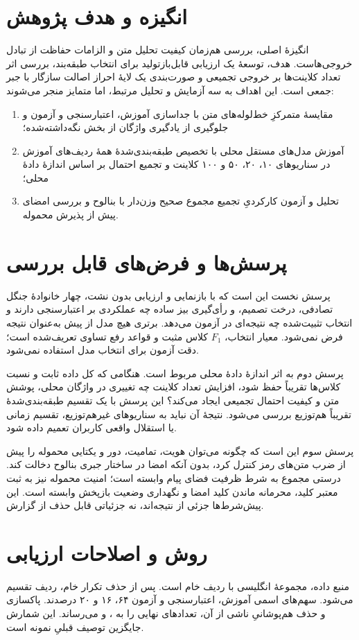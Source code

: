 \section*{انگیزه و هدف پژوهش}
انگیزۀ اصلی، بررسی هم‌زمان کیفیت تحلیل متن و الزامات حفاظت از تبادل خروجی‌هاست. هدف، توسعۀ یک ارزیابی قابل‌بازتولید برای انتخاب طبقه‌بند، بررسی اثر تعداد کلاینت‌ها بر خروجی تجمیعی و صورت‌بندی یک لایۀ احراز اصالت سازگار با جبر جمعی است. این اهداف به سه آزمایش و تحلیل مرتبط، اما متمایز منجر می‌شوند:
\begin{enumerate}
\item مقایسۀ متمرکزِ خط‌لوله‌های متن با جداسازی آموزش، اعتبارسنجی و آزمون و جلوگیری از یادگیری واژگان از بخش نگه‌داشته‌شده؛
\item آموزش مدل‌های مستقل محلی با تخصیص طبقه‌بندی‌شدۀ همۀ ردیف‌های آموزش در سناریوهای ۱۰، ۲۰، ۵۰ و ۱۰۰ کلاینت و تجمیع احتمال بر اساس اندازۀ دادۀ محلی؛
\item تحلیل و آزمون کارکردیِ تجمیع مجموع صحیح وزن‌دار با بنالوح و بررسی امضای  پیش از پذیرش محموله.
\end{enumerate}

\section*{پرسش‌ها و فرض‌های قابل بررسی}
پرسش نخست این است که با بازنمایی  و ارزیابی بدون نشت، چهار خانوادۀ جنگل تصادفی، درخت تصمیم،  و رأی‌گیری بیز ساده چه عملکردی بر اعتبارسنجی دارند و انتخاب تثبیت‌شده چه نتیجه‌ای در آزمون می‌دهد. برتری هیچ مدل از پیش به‌عنوان نتیجه فرض نمی‌شود. معیار انتخاب، $F_1$ کلاس مثبت و قواعد رفع تساوی تعریف‌شده است؛ دقت آزمون برای انتخاب مدل استفاده نمی‌شود.

پرسش دوم به اثر اندازۀ دادۀ محلی مربوط است. هنگامی که کل داده ثابت و نسبت کلاس‌ها تقریباً حفظ شود، افزایش تعداد کلاینت چه تغییری در واژگان محلی، پوشش متن و کیفیت احتمال تجمیعی ایجاد می‌کند؟ این پرسش با یک تقسیم طبقه‌بندی‌شدۀ تقریباً هم‌توزیع بررسی می‌شود. نتیجۀ آن نباید به سناریوهای غیرهم‌توزیع، تقسیم زمانی یا استقلال واقعی کاربران تعمیم داده شود.

پرسش سوم این است که چگونه می‌توان هویت، تمامیت، دور و یکتایی محموله را پیش از ضرب متن‌های رمز کنترل کرد، بدون آنکه امضا در ساختار جبری بنالوح دخالت کند. درستی مجموع به شرط ظرفیت فضای پیام وابسته است؛ امنیت محموله نیز به ثبت معتبر کلید، محرمانه ماندن کلید امضا و نگهداری وضعیت بازپخش وابسته است. این پیش‌شرط‌ها جزئی از نتیجه‌اند، نه جزئیاتی قابل حذف از گزارش.

\section*{روش و اصلاحات ارزیابی}
منبع داده، مجموعۀ انگلیسی  با  ردیف خام است. پس از حذف تکرار خام،  ردیف تقسیم می‌شود. سهم‌های اسمی آموزش، اعتبارسنجی و آزمون ۶۴، ۱۶ و ۲۰ درصدند. پاکسازی و حذف هم‌پوشانیِ ناشی از آن، تعدادهای نهایی را به ،  و  می‌رساند. این شمارش جایگزین توصیف قبلیِ  نمونه است.

